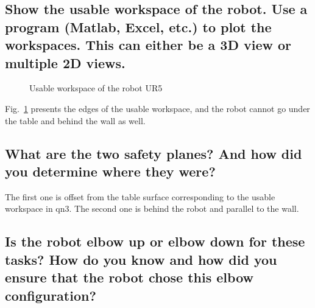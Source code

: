 \documentclass[letterpaper,11pt]{texMemo} %
\begin{document}
\subsection{Show the usable workspace of the robot. Use a program (Matlab, Excel, etc.) to plot the workspaces. This can either be a 3D view or multiple 2D views.}



\begin{figure}[H]
	\centering   
	\hspace{0.1in} 
	\hspace{0.1in}
	\caption{Usable workspace of the robot UR5 } 
	\label{fig:1}
\end{figure}

Fig.~\ref{fig:1} presents the edges of the usable workspace, and the robot cannot go under the table and behind the wall as well.


\subsection{What are the two safety planes? And how did you determine where they were?}

The first one is offset from the table surface corresponding to the usable workspace in qn3. The second one is behind the robot and parallel to the wall.



\subsection{Is the robot elbow up or elbow down for these tasks? How do you know and how did you ensure that the robot chose this elbow configuration?}
\end{document}
